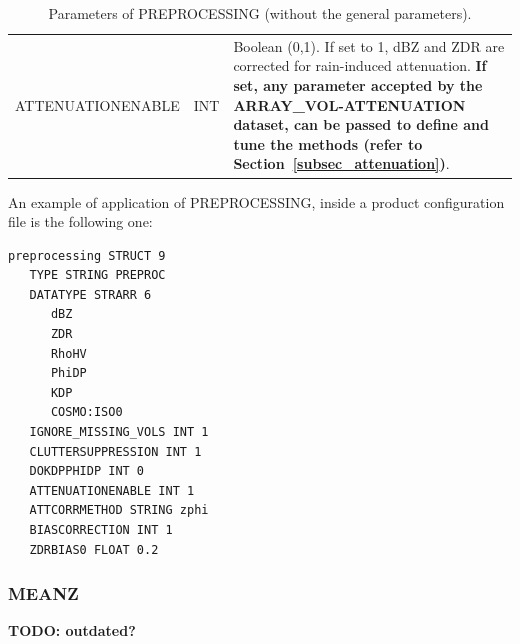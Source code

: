 \documentclass[a4paper,11pt,pdftex,twoside]{scrartcl}
\renewcommand{\bf}{\normalfont \bfseries}
\begin{document}
{{{\begin{table}[H]
\begin{tabularx}{\textwidth}{llX}
ATTENUATIONENABLE & INT & Boolean (0,1). If set to 1, dBZ and ZDR are corrected for rain-induced attenuation. \textbf{If set, any parameter accepted by the ARRAY\_VOL-ATTENUATION dataset, can be passed to define and tune the methods (refer to Section~\ref{subsec_attenuation})}.\\

\end{tabularx}
\caption{Parameters of PREPROCESSING (without the general parameters).}
\label{tab_dataset_preprocessing}
\end{table}

An example of application of PREPROCESSING, inside a product configuration file is the following one:

\begin{verbatim}
preprocessing STRUCT 9
   TYPE STRING PREPROC
   DATATYPE STRARR 6
      dBZ
      ZDR
      RhoHV
      PhiDP
      KDP
      COSMO:ISO0
   IGNORE_MISSING_VOLS INT 1
   CLUTTERSUPPRESSION INT 1
   DOKDPPHIDP INT 0
   ATTENUATIONENABLE INT 1
   ATTCORRMETHOD STRING zphi
   BIASCORRECTION INT 1
   ZDRBIAS0 FLOAT 0.2
\end{verbatim}


\subsubsection{MEANZ}
\label{subsec_meanz}

{\bf TODO: outdated?}

%

}}}
\end{document}
